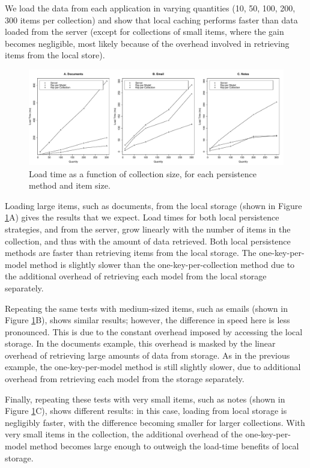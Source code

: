 \documentclass[12pt]{article}
\begin{document}
We load the data from each application in varying quantities (10, 50, 100, 200,
300 items per collection) and show that local caching performs faster than data
loaded from the server (except for collections of small items, where the gain
becomes negligible, most likely because of the overhead involved in retrieving
items from the local store).

\begin{figure}[th]
  \centering
  \includegraphics[width=\textwidth]{lines.pdf}
  \caption{Load time as a function of collection size, for each persistence
  method and item size.}
  \label{fig:line}
\end{figure}

Loading large items, such as documents, from the local storage (shown in Figure
\ref{fig:line}A) gives the results that we expect. Load times for both
local persistence strategies, and from the server, grow linearly with the number of
items in the collection, and thus with the amount of data retrieved. Both local
persistence methods are faster than retrieving items from the local storage.
The one-key-per-model method is slightly slower than the one-key-per-collection
method due to the additional overhead of retrieving each model from the local
storage separately.

Repeating the same tests with medium-sized items, such as emails (shown in
Figure \ref{fig:line}B), shows similar results; however, the difference in
speed here is less pronounced. This is due to the constant overhead imposed by
accessing the local storage. In the documents example, this overhead is masked
by the linear overhead of retrieving large amounts of data from storage. As in
the previous example, the one-key-per-model method is still slightly slower,
due to additional overhead from retrieving each model from the storage
separately.

Finally, repeating these tests with very small items, such as notes (shown in
Figure \ref{fig:line}C), shows different results: in this case, loading from
local storage is negligibly faster, with the difference becoming smaller for
larger collections. With very small items in the collection, the additional
overhead of the one-key-per-model method becomes large enough to outweigh the
load-time benefits of local storage.
\end{document}
